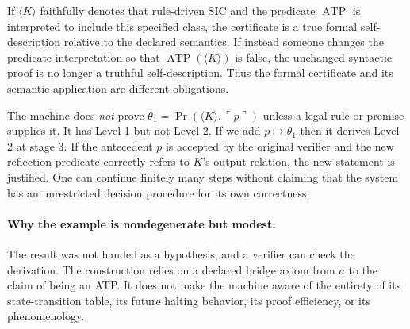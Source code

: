 \documentclass[11pt,letterpaper]{article}
\theoremstyle{definition}\newtheorem{definition}[theorem]{Definition}\newtheorem{example}[theorem]{Example}\newtheorem{protocol}[theorem]{Protocol}\newtheorem{question}[theorem]{Open Problem}
\theoremstyle{remark}\newtheorem{remark}[theorem]{Remark}
\newcommand{\Prov}{\operatorname{Pr}}
\newcommand{\qname}[1]{\ulcorner #1\urcorner}
\begin{document}
If $\langle K\rangle$ faithfully denotes that rule-driven SIC and the predicate $\operatorname{ATP}$ is interpreted to include this specified class, the certificate is a true formal self-description relative to the declared semantics. If instead someone changes the predicate interpretation so that $\operatorname{ATP}(\langle K\rangle)$ is false, the unchanged syntactic proof is no longer a truthful self-description. Thus the formal certificate and its semantic application are different obligations.

The machine does \emph{not} prove $\theta_1=\Prov(\langle K\rangle,\qname p)$ unless a legal rule or premise supplies it. It has Level 1 but not Level 2. If we add $p\mapsto\theta_1$ then it derives Level 2 at stage 3. If the antecedent $p$ is accepted by the original verifier and the new reflection predicate correctly refers to $K$'s output relation, the new statement is justified. One can continue finitely many steps without claiming that the system has an unrestricted decision procedure for its own correctness.

\paragraph{Why the example is nondegenerate but modest.} The result was not handed as a hypothesis, and a verifier can check the derivation. The construction relies on a declared bridge axiom from $a$ to the claim of being an ATP. It does not make the machine aware of the entirety of its state-transition table, its future halting behavior, its proof efficiency, or its phenomenology.
\end{document}
